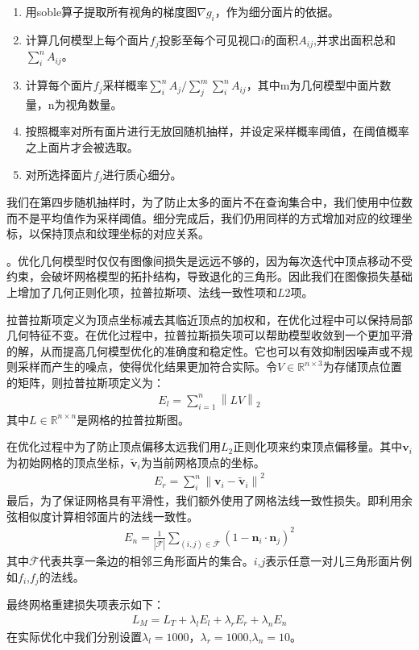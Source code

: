 \begin{enumerate}
	\item 用soble算子提取所有视角的梯度图$\nabla g_i$，作为细分面片的依据。
	\item 计算几何模型上每个面片$f_j$投影至每个可见视口$i$的面积$A_{ij}$,并求出面积总和$\sum_{i}^{n} A_{ij}$。
	\item 计算每个面片$f_j$采样概率$\sum_{i}^{n} A_{j} / \sum_{j}^{m}\sum_{i}^{n} A_{ij}$，其中m为几何模型中面片数量，n为视角数量。
	\item 按照概率对所有面片进行无放回随机抽样，并设定采样概率阈值，在阈值概率之上面片才会被选取。
	\item 对所选择面片$f_j$进行质心细分。
\end{enumerate}

我们在第四步随机抽样时，为了防止太多的面片不在查询集合中，我们使用中位数而不是平均值作为采样阈值。细分完成后，我们仍用同样的方式增加对应的纹理坐标，以保持顶点和纹理坐标的对应关系。\par
。优化几何模型时仅仅有图像间损失是远远不够的，因为每次迭代中顶点移动不受约束，会破坏网格模型的拓扑结构，导致退化的三角形。因此我们在图像损失基础上增加了几何正则化项，拉普拉斯项、法线一致性项和$L2$项。\par
拉普拉斯项定义为顶点坐标减去其临近顶点的加权和，在优化过程中可以保持局部几何特征不变。在优化过程中，拉普拉斯损失项可以帮助模型收敛到一个更加平滑的解，从而提高几何模型优化的准确度和稳定性。它也可以有效抑制因噪声或不规则采样而产生的噪点，使得优化结果更加符合实际。令$V \in \mathbb{R}^{n\times3}$为存储顶点位置的矩阵，则拉普拉斯项定义为：
\begin{align}
	E_l = \sum_{i=1}^{n}\left \| LV \right \|_2 
\end{align}
其中$L\in\mathbb{R}^{n\times n} $是网格的拉普拉斯图。\par
在优化过程中为了防止顶点偏移太远我们用$L_2$正则化项来约束顶点偏移量。其中$\mathbf{v}_{i}$为初始网格的顶点坐标，$\widetilde{\mathbf{v}}_{i}$为当前网格顶点的坐标。
\begin{align}
	E_{r}=\sum_{i}^{n}\left\|\mathbf{v}_{i}-\widetilde{\mathbf{v}}_{i}\right\|^{2}
\end{align}
最后，为了保证网格具有平滑性，我们额外使用了网格法线一致性损失。即利用余弦相似度计算相邻面片的法线一致性。
\begin{align}
	E_n= \frac{1}{|\overline{\mathcal{F}}|} \sum_{(i, j) \in \overline{\mathcal{F}}}\left(1-\mathbf{n}_{i} \cdot \mathbf{n}_{j}\right)^{2}
\end{align}
其中$\overline{\mathcal{F}}$代表共享一条边的相邻三角形面片的集合。$i$,$j$表示任意一对儿三角形面片例如$f_i$,$f_j$的法线。\par
最终网格重建损失项表示如下：
\begin{align}
	L_M = L_T + \lambda_l E_l +\lambda_r E_r+\lambda_n E_n
\end{align}
在实际优化中我们分别设置$\lambda_l = 1000$，$\lambda_r = 1000$,$\lambda_n = 10$。
